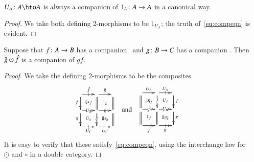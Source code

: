 \documentclass{amsart}
\begin{document}
\begin{lem}\label{thm:comp-unit}
  $U_A\maps A\hto A$ is always a companion of $1_A\colon A\to A$ in a
  canonical way.
\end{lem}
\begin{proof}
  We take both defining 2-morphisms to be
  $1_{U_A}$; the truth of~\eqref{eq:compeqn} is evident.
\end{proof}

\begin{lem}\label{thm:comp-compose}
  Suppose that $f\colon A\to B$ has a companion \fhat\ and $g\colon B\to
  C$ has a companion \ghat.  Then $\hat{g}\odot\hat{f}$ is a companion of
  $gf$.
\end{lem}
\begin{proof}
  We take the defining 2-morphisms to be the composites
  \[\vcenter{\xymatrix@-.5pc{
      \ar[r]|-@{|}^-{\fhat} \ar[d]_f \ar@{}[dr]|{\Downarrow \epsilon_{\hat{f}}}&
      \ar[r]|-@{|}^-{\ghat} \ar@{=}[d] \ar@{}[dr]|{1_{\ghat}} &
      \ar@{=}[d]\\
      \ar[r]|-{U_B} \ar[d]_g \ar@{}[dr]|{U_g} &
      \ar[r]|-{\ghat} \ar[d]|g \ar@{}[dr]|{\Downarrow \epsilon_{\hat{g}}}&
      \ar@{=}[d]\\
      \ar[r]|-@{|}_-{U_C} &
      \ar[r]|-@{|}_-{U_C} &
    }}\quad\text{and}\quad
  \vcenter{\xymatrix@-.5pc{
      \ar[r]|-@{|}^-{U_A} \ar@{=}[d] \ar@{}[dr]|{\Downarrow \eta_{\hat{f}}} &
      \ar[r]|-@{|}^-{U_A} \ar[d]|f \ar@{}[dr]|{U_f} &
      \ar[d]^f\\
      \ar[r]|-{\fhat} \ar@{=}[d] \ar@{}[dr]|{1_{\fhat}} &
      \ar[r]|-{U_B} \ar@{=}[d] \ar@{}[dr]|{\Downarrow \eta_{\hat{g}}}&
      \ar[d]^g\\
      \ar[r]|-@{|}_-{\fhat} &
      \ar[r]|-@{|}_-{\ghat} &
    }}
  \]
  It is easy to verify that these satisfy~\eqref{eq:compeqn}, using
  the interchange law for $\odot$ and $\circ$ in a double category.
\end{proof}
\end{document}
